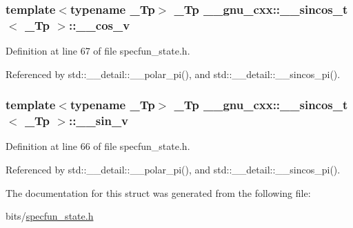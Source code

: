 \subsubsection[{\texorpdfstring{\+\_\+\+\_\+cos\+\_\+v}{__cos_v}}]{\setlength{\rightskip}{0pt plus 5cm}template$<$typename \+\_\+\+Tp$>$ \+\_\+\+Tp {\bf \+\_\+\+\_\+gnu\+\_\+cxx\+::\+\_\+\+\_\+sincos\+\_\+t}$<$ \+\_\+\+Tp $>$\+::\+\_\+\+\_\+cos\+\_\+v}\hypertarget{struct____gnu__cxx_1_1____sincos__t_ae88c123c9c9b2d138fdaa43b0c1addb6}{}\label{struct____gnu__cxx_1_1____sincos__t_ae88c123c9c9b2d138fdaa43b0c1addb6}


Definition at line 67 of file specfun\+\_\+state.\+h.



Referenced by std\+::\+\_\+\+\_\+detail\+::\+\_\+\+\_\+polar\+\_\+pi(), and std\+::\+\_\+\+\_\+detail\+::\+\_\+\+\_\+sincos\+\_\+pi().

\subsubsection[{\texorpdfstring{\+\_\+\+\_\+sin\+\_\+v}{__sin_v}}]{\setlength{\rightskip}{0pt plus 5cm}template$<$typename \+\_\+\+Tp$>$ \+\_\+\+Tp {\bf \+\_\+\+\_\+gnu\+\_\+cxx\+::\+\_\+\+\_\+sincos\+\_\+t}$<$ \+\_\+\+Tp $>$\+::\+\_\+\+\_\+sin\+\_\+v}\hypertarget{struct____gnu__cxx_1_1____sincos__t_a22a21d9a5658097549cbca39b891fd27}{}\label{struct____gnu__cxx_1_1____sincos__t_a22a21d9a5658097549cbca39b891fd27}


Definition at line 66 of file specfun\+\_\+state.\+h.



Referenced by std\+::\+\_\+\+\_\+detail\+::\+\_\+\+\_\+polar\+\_\+pi(), and std\+::\+\_\+\+\_\+detail\+::\+\_\+\+\_\+sincos\+\_\+pi().



The documentation for this struct was generated from the following file\+:\begin{DoxyCompactItemize}
\item 
bits/\hyperlink{specfun__state_8h}{specfun\+\_\+state.\+h}\end{DoxyCompactItemize}

